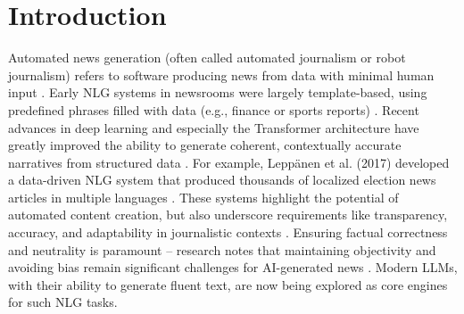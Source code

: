 \section*{Introduction}

Automated news generation (often called automated journalism or robot journalism) refers to software producing news from data with minimal human input \cite{acl_anthology}. Early NLG systems in newsrooms were largely template-based, using predefined phrases filled with data (e.g., finance or sports reports) \cite{acl_anthology}. Recent advances in deep learning and especially the Transformer architecture have greatly improved the ability to generate coherent, contextually accurate narratives from structured data \cite{arxiv_transformer}. For example, Leppänen et al. (2017) developed a data-driven NLG system that produced thousands of localized election news articles in multiple languages \cite{acl_anthology}. These systems highlight the potential of automated content creation, but also underscore requirements like transparency, accuracy, and adaptability in journalistic contexts \cite{acl_anthology}. Ensuring factual correctness and neutrality is paramount – research notes that maintaining objectivity and avoiding bias remain significant challenges for AI-generated news \cite{arxiv_bias}. Modern LLMs, with their ability to generate fluent text, are now being explored as core engines for such NLG tasks.